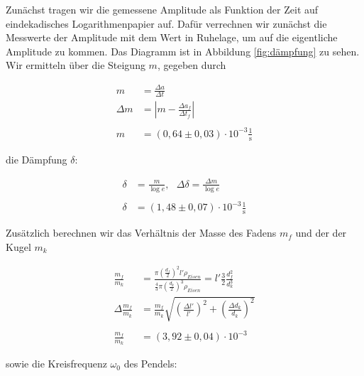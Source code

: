 \documentclass{article}
\begin{document}
Zunächst tragen wir die gemessene Amplitude als Funktion der Zeit auf eindekadisches Logarithmenpapier auf. Dafür verrechnen wir zunächst die Messwerte der Amplitude mit dem Wert in Ruhelage, um auf die eigentliche Amplitude zu kommen. Das Diagramm ist in Abbildung \ref{fig:dämpfung} zu sehen. Wir ermitteln über die Steigung $m$, gegeben durch

\begin{equation}
    \begin{split}
        m &= \frac{\Delta a}{\Delta t} \\
        \Delta m &= \left| m - \frac{\Delta a_f}{\Delta t_f} \right| \\ \\
        m &= (0,64 \pm 0,03) \cdot 10^{-3} \frac{1}{\text{s}}
    \end{split}
    \label{res:m}
\end{equation}

die Dämpfung $\delta$:

\begin{equation}
    \begin{split}
        \delta &= \frac{m}{\log{e}}, \ \ \ \Delta \delta = \frac{\Delta m}{\log{e}} \\ \\
        \delta &= (1,48 \pm 0,07) \cdot 10^{-3} \frac{1}{\text{s}}
    \end{split}
    \label{res:delta}
\end{equation}

Zusätzlich berechnen wir das Verhältnis der Masse des Fadens $m_f$ und der der Kugel $m_k$

\begin{equation}
    \begin{split}
        \frac{m_f}{m_k} &= \frac{\pi \left( \frac{d_f}{2} \right)^2 l' \rho_{Eisen}}{\frac{4}{3}\pi \left( \frac{d_k}{2} \right)^3 \rho_{Eisen}} = l' \frac{3}{2} \frac{d_f^2}{d_k^3} \\
        \Delta \frac{m_f}{m_k} &= \frac{m_f}{m_k} \sqrt{\left( \frac{\Delta l'}{l'} \right)^2 + \left( \frac{\Delta d_k}{d_k} \right)^2} \\ \\
        \frac{m_f}{m_k} &= (3,92 \pm 0,04) \cdot 10^{-3}
    \end{split}
    \label{res:masses}
\end{equation}

\newpage

sowie die Kreisfrequenz $\omega_0$ des Pendels:
\end{document}
